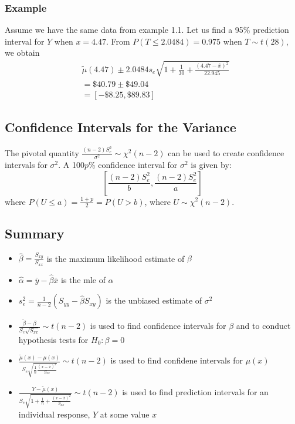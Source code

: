 \documentclass[12pt]{article}
\begin{document}
\subsubsection{Example}
Assume we have the same data from example 1.1. Let us find a 95\% prediction interval for $Y$ when $x=4.47$. From $P(T\leq 2.0484)=0.975$ when $T\sim t(28)$, we obtain
\begin{align*}
    &\tilde\mu(4.47)\pm 2.0484s_e\sqrt{1+\frac{1}{30}+\frac{(4.47-\bar x)^2}{22.945}}\\
    &=\$ 40.79\pm \$49.04\\
    &=[-\$ 8.25, \$89.83]
\end{align*}

\subsection{Confidence Intervals for the Variance}
The pivotal quantity $\frac{(n-2)S_e^2}{\sigma^2}\sim\chi^2(n-2)$ can be used to create confidence intervals for $\sigma^2$. A 100$p$\% confidence interval for $\sigma^2$ is given by: \[\left[\frac{(n-2)S_e^2}{b},\frac{(n-2)S^2_e}{a}\right]\] where $P(U\leq a)=\frac{1+p}{2}=P(U>b)$, where $U\sim\chi^2(n-2)$.
\subsection{Summary}
\begin{itemize}
    \item $\hat\beta=\frac{S_{xy}}{S_{xx}}$ is the maximum likelihood estimate of $\beta$
    \item $\hat\alpha=\bar y-\hat\beta \bar x$ is the mle of $\alpha$
    \item $s_e^2=\frac{1}{n-2}(S_{yy}-\hat\beta S_{xy})$ is the unbiased estimate of $\sigma^2$
    \item $\frac{\tilde\beta-\beta}{S_e\sqrt{S_{xx}}}\sim t(n-2)$ is used to find confidence intervals for $\beta$ and to conduct hypothesis tests for $H_0:\beta = 0$
    \item $\frac{\tilde\mu(x)-\mu(x)}{S_e\sqrt{\frac{1}{n}\frac{(x-\bar x)^2}{S_{xx}}}}\sim t(n-2)$ is used to find confidene intervals for $\mu(x)$
    \item $\frac{Y-\tilde\mu(x)}{S_e\sqrt{1+\frac{1}{n}+\frac{(x-\bar x)^2}{S_{xx}}}}\sim t(n-2)$ is used to find prediction intervals for an individual response, $Y$ at some value $x$
\end{itemize}
\end{document}
